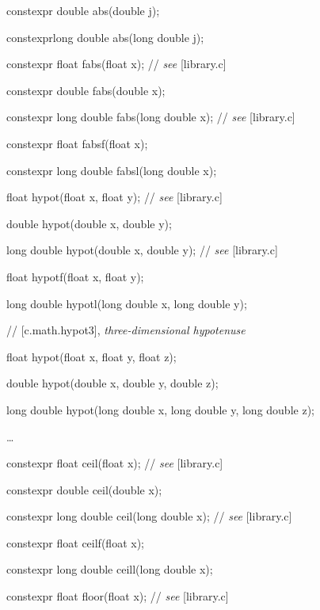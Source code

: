 \documentclass[prd,twocolumn,amsmath,amssymb,nofootinbib,eqsecnum]{revtex4-1}
\newcommand{\highlight}[1]{{\color{red} #1}}
\newcommand{\stdcomment}[1]{{// {\em see} [#1]}}
\begin{document}
{\highlight{constexpr} double abs(double j);

\highlight{constexpr}long double abs(long double j);

\vspace{2ex}

\highlight{constexpr} float fabs(float x); \stdcomment{library.c}

\highlight{constexpr} double fabs(double x);

\highlight{constexpr} long double fabs(long double x); \stdcomment{library.c}

\highlight{constexpr} float fabsf(float x);

\highlight{constexpr} long double fabsl(long double x);

\vspace{2ex}

float hypot(float x, float y); \stdcomment{library.c}

double hypot(double x, double y);

long double hypot(double x, double y); \stdcomment{library.c}

float hypotf(float x, float y);

long double hypotl(long double x, long double y);

\vspace{2ex}

// [c.math.hypot3], {\em three-dimensional hypotenuse}

float hypot(float x, float y, float z);

double hypot(double x, double y, double z);

long double hypot(long double x, long double y, long double z);

\vspace{2ex}
\ldots
\vspace{2ex}

\highlight{constexpr} float ceil(float x); \stdcomment{library.c}

\highlight{constexpr} double ceil(double x);

\highlight{constexpr} long double ceil(long double x); \stdcomment{library.c}

\highlight{constexpr} float ceilf(float x);

\highlight{constexpr} long double ceill(long double x);

\vspace{2ex}

\highlight{constexpr} float floor(float x); \stdcomment{library.c}

}
\end{document}
